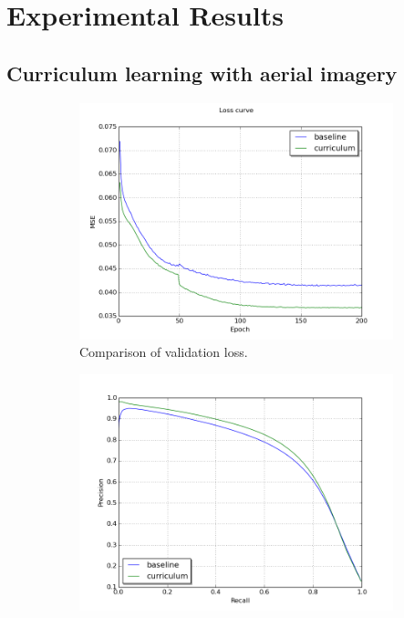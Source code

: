 \section{Experimental Results}
\label{sec:experimentalResults}

\subsection{Curriculum learning with aerial imagery}
\label{sec:results_curriculum_learning_aerial_imagery}
\begin{figure}
\begin{subfigure}{0.48\textwidth}
\includegraphics[width=\linewidth]{figs/curr100/validation_loss_curve.png}
\caption{Comparison of validation loss.} \label{fig:curr100_loss}
\end{subfigure}
\hspace*{\fill} %
\begin{subfigure}{0.48\textwidth}
\includegraphics[width=\linewidth]{figs/curr100/validation_precision_recall.png}

\end{subfigure}
\end{figure}
